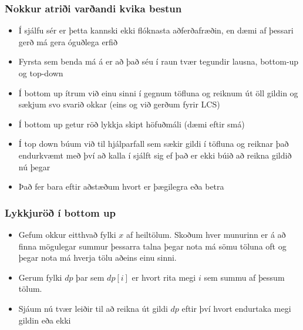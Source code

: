 \documentclass{beamer}
\begin{document}
\begin{frame}
\frametitle{Nokkur atriði varðandi kvika bestun}

\begin{itemize}

\item<1-> Í sjálfu sér er þetta kannski ekki flóknasta aðferðafræðin, en dæmi af þessari gerð má gera óguðlega erfið

\item<2-> Fyrsta sem benda má á er að það séu í raun tvær tegundir lausna, bottom-up og top-down

\item<3-> Í bottom up ítrum við einu sinni í gegnum töfluna og reiknum út öll gildin og sækjum svo svarið okkar (eins og við gerðum fyrir LCS)

\item<4-> Í bottom up getur röð lykkja skipt höfuðmáli (dæmi eftir smá)

\item<5-> Í top down búum við til hjálparfall sem sækir gildi í töfluna og reiknar það endurkvæmt með því að kalla í sjálft sig ef það er ekki búið að reikna gildið nú þegar

\item<6-> Það fer bara eftir aðstæðum hvort er þægilegra eða betra

\end{itemize}

\end{frame}

\begin{frame}
\frametitle{Lykkjuröð í bottom up}

\begin{itemize}

\item<1-> Gefum okkur eitthvað fylki $x$ af heiltölum. Skoðum hver munurinn er á að finna mögulegar summur þessarra talna þegar nota má sömu töluna oft og þegar nota má hverja tölu aðeins einu sinni.

\item<2-> Gerum fylki $dp$ þar sem $dp[i]$ er hvort rita megi $i$ sem summu af þessum tölum.

\item<3-> Sjáum nú tvær leiðir til að reikna út gildi $dp$ eftir því hvort endurtaka megi gildin eða ekki

\end{itemize}

\end{frame}
\end{document}
